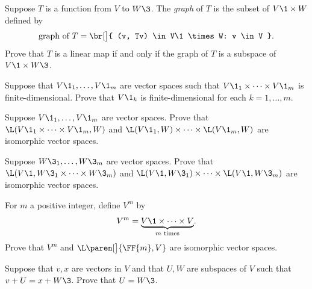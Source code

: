 
\exercise
Suppose $T$ is a function from $V$ to $W\3$. The \emph{graph} of $T$ is the subset of
$V\1 \times W$ defined by
\[
\text{graph of}\ T = \br[\big]{ (v, Tv) \in V\1 \times W: v \in V }.
\]
Prove that $T$ is a linear map if and only if the graph of $T$
is a subspace of $V\1 \times W\3$.


\exercise
Suppose that $V\1_1, \dots, V\1_m$ are vector spaces such that $V\1_1 \times \dots \times V\1_m$ is finite-dimensional. Prove that $V\1_k$ is finite-dimensional for each $k = 1, \dots, m$.

\exercise
Suppose $V\1_1, \dots, V\1_m$ are vector spaces. Prove that $\L(V\1_1 \times \dots \times V\1_m, W)$ and $\L(V\1_1, W) \times \dots \times \L(V\1_m, W)$ are isomorphic vector spaces.



\exercise
Suppose $W\3_1, \dots, W\3_m$ are vector spaces. Prove that $\L(V\1, W\3_1 \times \dots \times W\3_m)$ and
$\L(V\1, W\3_1) \times \dots \times \L(V\1, W\3_m)$ are isomorphic vector spaces.


\exercise
For $m$ a positive integer, define $V^m$ by
\[
V^m = \underbrace{V\1 \times \dots \times V}_{m \text{\ times}}\!.
\]
Prove that $V^m$ and $\L\paren[\big]{\FF{m}, V}$ are isomorphic vector spaces.


\exercise
Suppose that $v, x$ are vectors in $V$ and that $U, W$ are subspaces of $V$ such that $v + U = x + W\3$. Prove that $U = W\3$.


